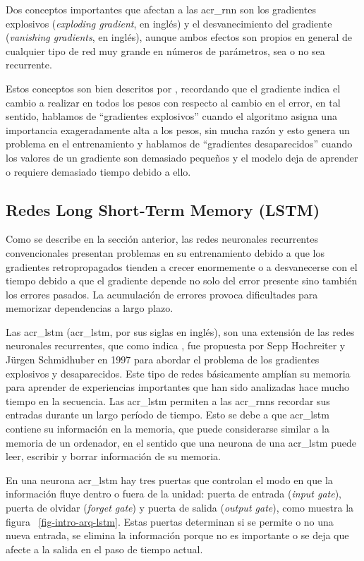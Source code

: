 Dos conceptos importantes que afectan a las \acrshort{acr_rnn} son los gradientes explosivos (\textit{exploding gradient}, en inglés) y el desvanecimiento del gradiente (\textit{vanishing gradients}, en inglés), aunque ambos efectos son propios en general de cualquier tipo de red muy grande en números de parámetros, sea o no sea recurrente. 

Estos conceptos son bien descritos por \cite{torres2019deep}, recordando que el gradiente indica el cambio a realizar en todos los pesos con respecto al cambio en el error, en tal sentido, hablamos de ``gradientes explosivos'' cuando el algoritmo asigna una importancia exageradamente alta a los pesos, sin mucha razón y esto genera un problema en el entrenamiento y hablamos de ``gradientes desaparecidos'' cuando los valores de un gradiente son demasiado pequeños y el modelo deja de aprender o requiere demasiado tiempo debido a ello. 

\subsection{Redes Long Short-Term Memory (LSTM)}
\label{section-lstm}
Como se describe en la sección anterior, las redes neuronales recurrentes convencionales presentan problemas en su entrenamiento debido a que los gradientes retropropagados tienden a crecer enormemente o a desvanecerse con el tiempo debido a que el gradiente depende no solo del error presente sino también los errores pasados. La acumulación de errores provoca dificultades para memorizar dependencias a largo plazo.

Las \acrlong{acr_lstm} (\acrshort{acr_lstm}, por sus siglas en inglés), son una extensión de las redes neuronales recurrentes, que como indica \cite{thomas2020natural}, fue propuesta por Sepp Hochreiter y Jürgen Schmidhuber en 1997 para abordar el problema de los gradientes explosivos y desaparecidos. Este tipo de redes básicamente amplían su memoria para aprender de experiencias importantes que han sido analizadas hace mucho tiempo en la secuencia. Las \acrshort{acr_lstm} permiten a las \acrshort{acr_rnn}s recordar sus entradas durante un largo período de tiempo. Esto se debe a que \acrshort{acr_lstm} contiene su información en la memoria, que puede considerarse similar a la memoria de un ordenador, en el sentido que una neurona de una \acrshort{acr_lstm} puede leer, escribir y borrar información de su memoria.

En una neurona \acrshort{acr_lstm} hay tres puertas que controlan el modo en que la información fluye dentro o fuera de la unidad: puerta de entrada (\textit{input gate}), puerta de olvidar (\textit{forget gate}) y puerta de salida (\textit{output gate}), como muestra la figura ~\ref{fig-intro-arq-lstm}. Estas puertas determinan si se permite o no una nueva entrada, se elimina la información porque no es importante o se deja que afecte a la salida en el paso de tiempo actual.

